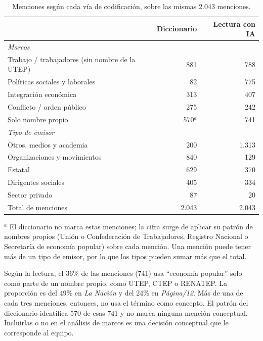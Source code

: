 \documentclass[11pt,a4paper]{article}
\newcommand{\pdoce}{\textit{Página/12}}
\newcommand{\lanac}{\textit{La Nación}}
\newcommand{\EP}{economía popular}
\begin{document}
\begin{table}[h]
\centering\small
\caption{Menciones según cada vía de codificación, sobre las mismas 2.043 menciones.}
\label{tab:metodos}
\begin{tabular}{lrr}
\toprule
 & \textbf{Diccionario} & \textbf{Lectura con IA} \\
\midrule
\multicolumn{3}{l}{\textit{Marcos}} \\
\quad Trabajo / trabajadores (sin nombre de la UTEP) & 881 & 788 \\
\quad Políticas sociales y laborales & 82 & 775 \\
\quad Integración económica & 313 & 407 \\
\quad Conflicto / orden público & 275 & 242 \\
\quad Solo nombre propio & 570$^{a}$ & 741 \\
\midrule
\multicolumn{3}{l}{\textit{Tipo de emisor}} \\
\quad Otros, medios y academia & 200 & 1.313 \\
\quad Organizaciones y movimientos & 840 & 129 \\
\quad Estatal & 629 & 370 \\
\quad Dirigentes sociales & 405 & 334 \\
\quad Sector privado & 87 & 20 \\
\midrule
Total de menciones & 2.043 & 2.043 \\
\bottomrule
\end{tabular}

\vspace{2pt}
\begin{minipage}{0.86\linewidth}\footnotesize
$^{a}$ El diccionario no marca estas menciones; la cifra surge de aplicar su patrón de nombres propios (Unión o Confederación de Trabajadores, Registro Nacional o Secretaría de \EP) sobre cada mención. Una mención puede tener más de un tipo de emisor, por lo que los tipos pueden sumar más que el total.
\end{minipage}
\end{table}

Según la lectura, el 36\% de las menciones (741) usa \enquote{\EP} solo como parte de un nombre propio, como UTEP, CTEP o RENATEP. La proporción es del 49\% en \lanac{} y del 24\% en \pdoce. Más de una de cada tres menciones, entonces, no usa el término como concepto. El patrón del diccionario identifica 570 de esas 741 y no marca ninguna mención conceptual. Incluirlas o no en el análisis de marcos es una decisión conceptual que le corresponde al equipo.
\end{document}
